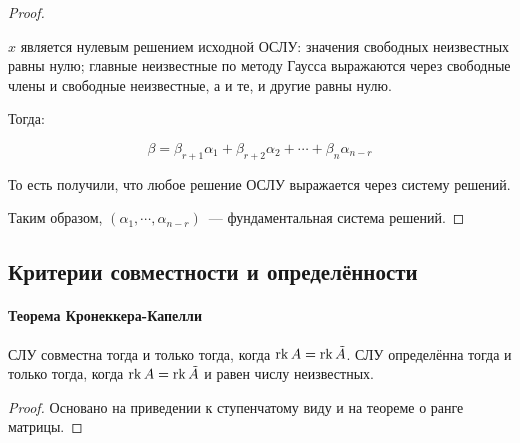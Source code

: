 \begin{proof}
\begin{enumerate}
			$x$ является нулевым решением исходной ОСЛУ: значения
			свободных неизвестных равны нулю; главные неизвестные по методу Гаусса
			выражаются через свободные члены и свободные неизвестные, а и те, и другие
			равны нулю.

			Тогда:

			$$
				\beta=
					\beta_{r+1}\alpha_1+
					\beta_{r+2}\alpha_2+
					\cdots+
					\beta_{n}\alpha_{n-r}
			$$

			То есть получили, что любое решение ОСЛУ выражается через систему решений.
	\end{enumerate}

	Таким образом, $(\alpha_1,\cdots,\alpha_{n-r})$~--- фундаментальная система решений.
\end{proof}
  
  \subsection{Критерии совместности и определённости}
    \paragraph{Теорема Кронеккера-Капелли}
    
    \begin{theorem}
      СЛУ совместна тогда и только тогда, когда $\operatorname{rk} A = \operatorname{rk}\tilde A$. СЛУ определённа тогда и только тогда, когда $\operatorname{rk} A=\operatorname{rk}\tilde A$ и равен числу неизвестных.
    \end{theorem}
    \begin{proof}
      Основано на приведении к ступенчатому виду и на теореме о ранге матрицы.
    \end{proof}
